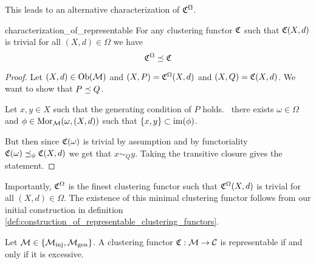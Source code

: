 This leads to an alternative characterization of $\mathfrak{C}^\Omega$.

\begin{proposition}{}{characterization_of_representable}
For any clustering functor $\mathfrak{C}$ such that $\mathfrak{C}(X,d)$ is trivial for all $(X,d) \in \Omega$ we have
$$
\mathfrak{C}^\Omega \preceq \mathfrak{C}
$$
\end{proposition}

\begin{proof}
Let $(X,d) \in \mathrm {Ob}(\mathcal{M})$ and $(X,P) = \mathfrak{C}^\Omega(X,d)$ and $(X,Q) = \mathfrak{C}(X,d)$. We want to show that $P \preceq Q$.

Let $x,y \in X$ such that the generating condition of $P$ holds. \Ie\ there exists $\omega \in \Omega$ and $\phi \in \mathrm {Mor}_{\mathcal{M}}(\omega, (X,d))$ such that $\{x,y\} \subset \operatorname*{im}(\phi)$.

But then since $\mathfrak{C}(\omega)$ is trivial by assumption and by functoriality $\mathfrak{C}(\omega) \preceq_\phi \mathfrak{C}(X,d)$ we get that $x \sim_Q y$. Taking the transitive closure gives the statement.


\end{proof}

Importantly, $\mathfrak{C}^\Omega$ is the finest clustering functor such that $\mathfrak{C}^\Omega(X,d)$ is trivial for all $(X,d) \in \Omega$. The existence of this minimal clustering functor follows from our initial construction in definition \ref{def:construction_of_representable_clustering_functors}.

\begin{theorem}{\cite[Thm.~6.2]{Carlsson2010}}{}
Let $\mathcal{M} \in \{{\mathcal{M}_\mathrm{inj}}, {\mathcal{M}_\mathrm{gen}}\}$. A clustering functor $\mathfrak{C}: \mathcal{M} \to \mathcal{C}$ is representable if and only if it is excessive.
\end{theorem}

